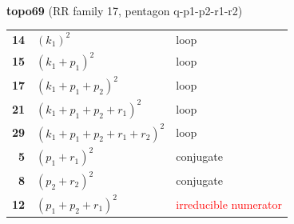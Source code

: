 \documentclass[10pt]{article}
\begin{document}
\begin{minipage}[t]{0.48\textwidth}
{}\\[2mm]\textbf{topo69} (RR family 17, pentagon q-p1-p2-r1-r2)\\[2pt]{\footnotesize\begin{tabular}{@{}r@{\ \ }l@{\ \ }l@{}}\textbf{14} & $(k_1)^2$ & loop\\
\textbf{15} & $(k_1+p_1)^2$ & loop\\
\textbf{17} & $(k_1+p_1+p_2)^2$ & loop\\
\textbf{21} & $(k_1+p_1+p_2+r_1)^2$ & loop\\
\textbf{29} & $(k_1+p_1+p_2+r_1+r_2)^2$ & loop\\
\textbf{5} & $(p_1+r_1)^2$ & conjugate\\
\textbf{8} & $(p_2+r_2)^2$ & conjugate\\
\textbf{12} & $(p_1+p_2+r_1)^2$ & \textcolor{red}{irreducible numerator}\\\end{tabular}}\end{minipage}\hfill%
\end{document}
